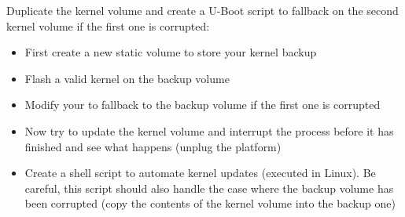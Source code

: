 Duplicate the kernel volume and create a U-Boot script to fallback on
the second kernel volume if the first one is corrupted:
\begin{itemize}
  \item First create a new static volume to store your kernel backup
  \item Flash a valid kernel on the backup volume
  \item Modify your  to fallback to the backup volume if the first one
    is corrupted
  \item Now try to update the kernel volume and interrupt the process before
    it has finished and see what happens (unplug the platform)
  \item Create a shell script to automate kernel updates (executed in Linux).
    Be careful, this script should also handle the case where the backup
    volume has been corrupted (copy the contents of the kernel volume into
    the backup one)
\end{itemize}

